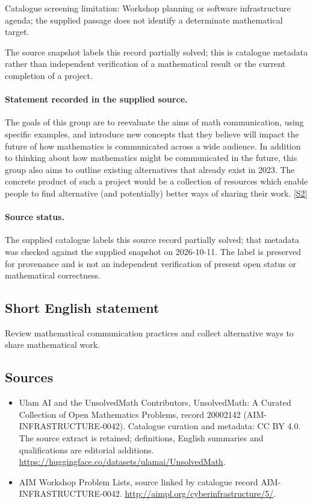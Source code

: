 \documentclass[11pt]{article}
\begin{document}
Catalogue screening limitation: Workshop planning or software infrastructure agenda; the supplied passage does not identify a determinate mathematical target.

The source snapshot labels this record partially solved; this is catalogue metadata rather than independent verification of a mathematical result or the current completion of a project.
\paragraph{Statement recorded in the supplied source.}
The goals of this group are to reevaluate the aims of math communication, using specific examples, and introduce new concepts that they believe will impact the future of how mathematics is communicated across a wide audience.
In addition to thinking about how mathematics might be communicated in the future, this group also aims to outline existing alternatives that already exist in 2023. The concrete product of such a project would be a collection of resources which enable people to find alternative (and potentially) better ways of sharing their work. \href{http://aimpl.org/cyberinfrastructure/5/}{[S2]}
\paragraph{Source status.}
The supplied catalogue labels this source record partially solved; that metadata was checked against the supplied snapshot on 2026-10-11. The label is preserved for provenance and is not an independent verification of present open status or mathematical correctness.
\subsection{Short English statement}
Review mathematical communication practices and collect alternative ways to share mathematical work.
\subsection{Sources}
\begin{itemize}
\item[S1] Ulam AI and the UnsolvedMath Contributors, UnsolvedMath: A Curated Collection of Open Mathematics Problems, record 20002142 (AIM-INFRASTRUCTURE-0042). Catalogue curation and metadata: CC BY 4.0. The source extract is retained; definitions, English summaries and qualifications are editorial additions.
\url{https://huggingface.co/datasets/ulamai/UnsolvedMath}.
\item[S2] AIM Workshop Problem Lists, source linked by catalogue record AIM-INFRASTRUCTURE-0042.
\url{http://aimpl.org/cyberinfrastructure/5/}.
\end{itemize}
\end{document}
